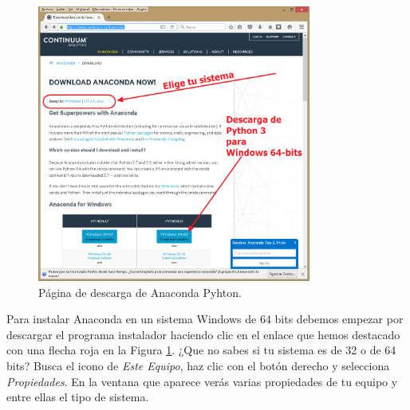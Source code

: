\documentclass[10pt,a4paper]{article}\usepackage[]{graphicx}\usepackage[]{color}
\begin{document}
\begin{figure}[thb]
\begin{center}
\includegraphics[width=9cm]{../fig/Tut-00-py-01-Anaconda-a.png}
\caption{Página de descarga de Anaconda Pyhton.}
\label{cap01:fig:Tut-00-py-01-Anaconda}
\end{center}
\end{figure}

Para instalar Anaconda en un sistema Windows de 64 bits debemos empezar por descargar el programa instalador haciendo clic en el enlace que hemos destacado con una flecha roja en la Figura \ref{cap01:fig:Tut-00-py-01-Anaconda}. ¿Que no sabes si tu sistema es de 32 o de 64 bits?  Busca el icono de {\em Este Equipo}, haz clic con el botón derecho y selecciona {\em Propiedades}. En la ventana que aparece verás varias propiedades de tu equipo y entre ellas el tipo de sistema.
\end{document}
